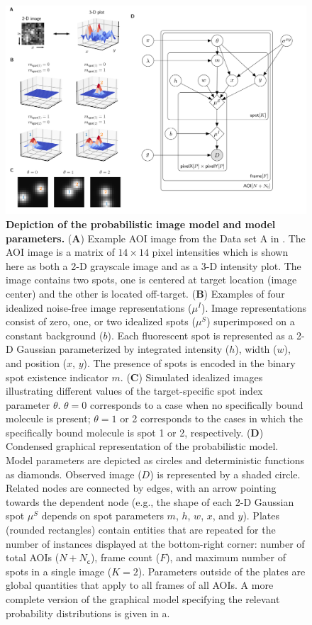 \begin{figure}
\begin{fullwidth}
\includegraphics[width=183mm]{figures/graphical_model.png}
\caption{\textbf{Depiction of the probabilistic image model and model parameters.} (\textbf{A}) Example AOI image from the Data set A in . The AOI image is a matrix of $14 \times 14$ pixel intensities which is shown here as both a 2-D grayscale image and as a 3-D intensity plot. The image contains two spots, one is centered at target location (image center) and the other is located off-target. (\textbf{B}) Examples of four idealized noise-free image representations ($\mu^I$). Image representations consist of zero, one, or two idealized spots ($\mu^S$) superimposed on a constant background ($b$). Each fluorescent spot is represented as a 2-D Gaussian parameterized by integrated intensity ($h$), width ($w$), and position ($x$, $y$). The presence of spots is encoded in the binary spot existence indicator $m$. (\textbf{C}) Simulated idealized images illustrating different values of the target-specific spot index parameter $\theta$. $\theta = 0$ corresponds to a case when no specifically bound molecule is present; $\theta = 1$ or 2 corresponds to the cases in which the specifically bound molecule is spot 1 or 2, respectively. (\textbf{D}) Condensed graphical representation of the probabilistic model. Model parameters are depicted as circles and deterministic functions as diamonds. Observed image ($D$) is represented by a shaded circle. Related nodes are connected by edges, with an arrow pointing towards the dependent node (e.g., the shape of each 2-D Gaussian spot $\mu^S$ depends on spot parameters $m$, $h$, $w$, $x$, and $y$). Plates (rounded rectangles) contain entities that are repeated for the number of instances displayed at the bottom-right corner: number of total AOIs ($N+N_\mathsf{c}$), frame count ($F$), and maximum number of spots in a single image ($K=2$). Parameters outside of the plates are global quantities that apply to all frames of all AOIs. A more complete version of the graphical model specifying the relevant probability distributions is given in a. }

\end{fullwidth}
\end{figure}
